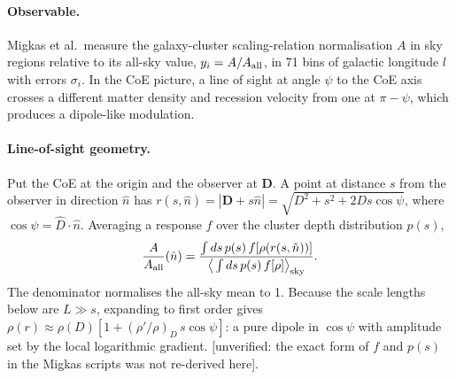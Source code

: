 \documentclass[10pt,twocolumn]{article}
\newcommand{\flag}[1]{\textsf{[unverified: #1]}}
\begin{document}
\paragraph{Observable.} Migkas et al.\ measure the galaxy-cluster scaling-relation normalisation $A$ in sky regions relative to its all-sky value, $y_i=A/A_{\rm all}$, in 71 bins of galactic longitude $l$ with errors $\sigma_i$. In the CoE picture, a line of sight at angle $\psi$ to the CoE axis crosses a different matter density and recession velocity from one at $\pi-\psi$, which produces a dipole-like modulation.

\paragraph{Line-of-sight geometry.} Put the CoE at the origin and the observer at $\mathbf D$. A point at distance $s$ from the observer in direction $\hat n$ has $r(s,\hat n)=|\mathbf D+s\hat n|=\sqrt{D^2+s^2+2Ds\cos\psi}$, where $\cos\psi=\hat D\cdot\hat n$. Averaging a response $f$ over the cluster depth distribution $p(s)$,
\begin{equation}\label{eq3}
\frac{A}{A_{\rm all}}(\hat n)=\frac{\int ds\,p(s)\,f[\rho(r(s,\hat n))]}{\big\langle\int ds\,p(s)\,f[\rho]\big\rangle_{\rm sky}} .
\end{equation}
The denominator normalises the all-sky mean to 1. Because the scale lengths below are $L\gg s$, expanding to first order gives $\rho(r)\approx\rho(D)[1+(\rho'/\rho)_D\,s\cos\psi]$: a pure dipole in $\cos\psi$ with amplitude set by the local logarithmic gradient. \flag{the exact form of $f$ and $p(s)$ in the Migkas scripts was not re-derived here}.
\end{document}
